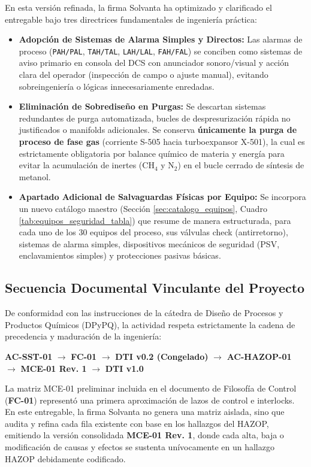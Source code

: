 \documentclass[10pt,letterpaper]{article}
\begin{document}
En esta versión refinada, la firma Solvanta ha optimizado y clarificado el entregable bajo tres directrices fundamentales de ingeniería práctica:
\begin{itemize}
    \item \textbf{Adopción de Sistemas de Alarma Simples y Directos:} Las alarmas de proceso (\texttt{PAH/PAL}, \texttt{TAH/TAL}, \texttt{LAH/LAL}, \texttt{FAH/FAL}) se conciben como sistemas de aviso primario en consola del DCS con anunciador sonoro/visual y acción clara del operador (inspección de campo o ajuste manual), evitando sobreingeniería o lógicas innecesariamente enredadas.
    \item \textbf{Eliminación de Sobrediseño en Purgas:} Se descartan sistemas redundantes de purga automatizada, bucles de despresurización rápida no justificados o manifolds adicionales. Se conserva \textbf{únicamente la purga de proceso de fase gas} (corriente S-505 hacia turboexpansor X-501), la cual es estrictamente obligatoria por balance químico de materia y energía para evitar la acumulación de inertes ($\text{CH}_4$ y $\text{N}_2$) en el bucle cerrado de síntesis de metanol.
    \item \textbf{Apartado Adicional de Salvaguardas Físicas por Equipo:} Se incorpora un nuevo catálogo maestro (Sección \ref{sec:catalogo_equipos}, Cuadro \ref{tab:equipos_seguridad_tabla}) que resume de manera estructurada, para cada uno de los 30 equipos del proceso, sus válvulas check (antirretorno), sistemas de alarma simples, dispositivos mecánicos de seguridad (PSV, enclavamientos simples) y protecciones pasivas básicas.
\end{itemize}

\subsection{Secuencia Documental Vinculante del Proyecto}
De conformidad con las instrucciones de la cátedra de Diseño de Procesos y Productos Químicos (DPyPQ), la actividad respeta estrictamente la cadena de precedencia y maduración de la ingeniería:
\begin{center}
\textbf{AC-SST-01} $\longrightarrow$ \textbf{FC-01} $\longrightarrow$ \textbf{DTI v0.2 (Congelado)} $\longrightarrow$ \textbf{AC-HAZOP-01} $\longrightarrow$ \textbf{MCE-01 Rev. 1} $\longrightarrow$ \textbf{DTI v1.0}
\end{center}
La matriz MCE-01 preliminar incluida en el documento de Filosofía de Control (\textbf{FC-01}) representó una primera aproximación de lazos de control e interlocks. En este entregable, la firma Solvanta no genera una matriz aislada, sino que audita y refina cada fila existente con base en los hallazgos del HAZOP, emitiendo la versión consolidada \textbf{MCE-01 Rev. 1}, donde cada alta, baja o modificación de causas y efectos se sustenta unívocamente en un hallazgo HAZOP debidamente codificado.
\end{document}
